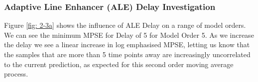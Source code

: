 \documentclass[12pt]{article}
\begin{document}
		\subsubsection{Adaptive Line Enhancer (ALE) Delay Investigation}
		\begin{minipage}[b]{0.49\textwidth}
				Figure \ref{fig: 2-3a} shows the influence of ALE Delay on a range of model orders. We can see the minimum MPSE for Delay of 5 for Model Order 5. As we increase the delay we see a linear increase in log emphasised MPSE, letting us know that the samples that are more than 5 time points away are increasingly uncorrelated to the current prediction, as expected for this second order moving average process.
		\end{minipage}%
		\begin{minipage}{0.04\textwidth}
			\hspace*{0.04\textwidth}
		\end{minipage}%
\end{document}
